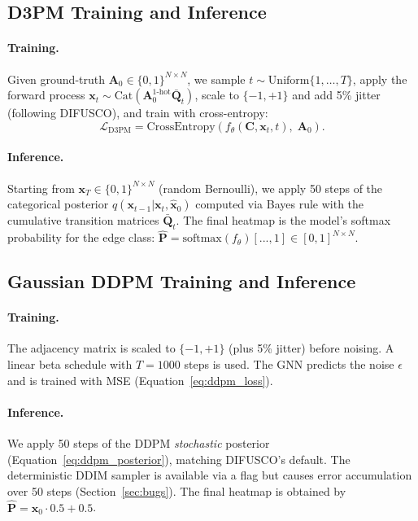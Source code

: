 \documentclass[11pt,a4paper]{article}
\begin{document}
\subsection{D3PM Training and Inference}
\label{sec:d3pm_method}
\paragraph{Training.}
Given ground-truth $\mathbf{A}_0 \in \{0,1\}^{N\times N}$, we sample
$t \sim \text{Uniform}\{1,\ldots,T\}$, apply the forward process
$\mathbf{x}_t \sim \text{Cat}(\mathbf{A}_0^{1\text{-hot}} \bar{\mathbf{Q}}_t)$,
scale to $\{-1,+1\}$ and add 5\% jitter (following DIFUSCO), and train with cross-entropy:
\begin{equation}
  \mathcal{L}_\text{D3PM} = \text{CrossEntropy}\!\left(f_\theta(\mathbf{C}, \mathbf{x}_t, t),\;
    \mathbf{A}_0\right).
\end{equation}

\paragraph{Inference.}
Starting from $\mathbf{x}_T \in \{0,1\}^{N\times N}$ (random Bernoulli), we apply 50 steps
of the categorical posterior $q(\mathbf{x}_{t-1}|\mathbf{x}_t, \hat{\mathbf{x}}_0)$
computed via Bayes rule with the cumulative transition matrices $\bar{\mathbf{Q}}_t$.
The final heatmap is the model's softmax probability for the edge class:
$\hat{\mathbf{P}} = \text{softmax}(f_\theta)[...,1] \in [0,1]^{N\times N}$.

\subsection{Gaussian DDPM Training and Inference}
\label{sec:gaussian_method}
\paragraph{Training.}
The adjacency matrix is scaled to $\{-1,+1\}$ (plus 5\% jitter) before noising.
A linear beta schedule with $T=1000$ steps is used. The GNN predicts the noise $\epsilon$
and is trained with MSE (Equation~\ref{eq:ddpm_loss}).

\paragraph{Inference.}
We apply 50 steps of the DDPM \emph{stochastic} posterior
(Equation~\ref{eq:ddpm_posterior}), matching DIFUSCO's default. The deterministic DDIM
sampler is available via a flag but causes error accumulation over 50 steps
(Section~\ref{sec:bugs}). The final heatmap is obtained by $\hat{\mathbf{P}} = \mathbf{x}_0 \cdot 0.5 + 0.5$.
\end{document}
